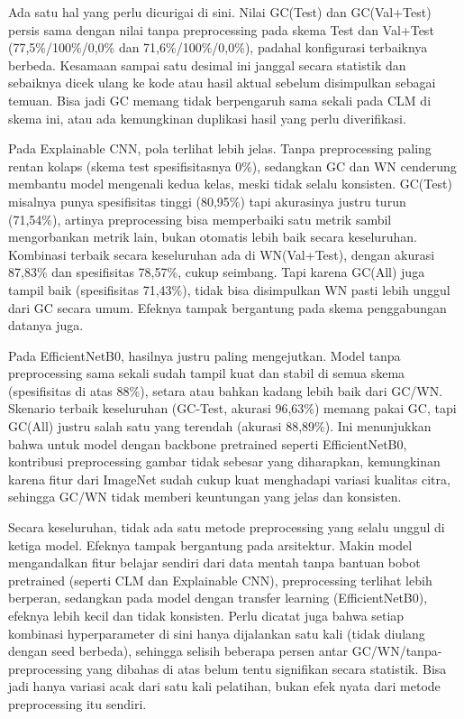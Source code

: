 Ada satu hal yang perlu dicurigai di sini. Nilai GC(Test) dan GC(Val+Test) persis sama dengan nilai tanpa preprocessing pada skema Test dan Val+Test (77,5\%/100\%/0,0\% dan 71,6\%/100\%/0,0\%), padahal konfigurasi terbaiknya berbeda. Kesamaan sampai satu desimal ini janggal secara statistik dan sebaiknya dicek ulang ke kode atau hasil aktual sebelum disimpulkan sebagai temuan. Bisa jadi GC memang tidak berpengaruh sama sekali pada CLM di skema ini, atau ada kemungkinan duplikasi hasil yang perlu diverifikasi.

Pada Explainable CNN, pola terlihat lebih jelas. Tanpa preprocessing paling rentan kolaps (skema test spesifisitasnya 0\%), sedangkan GC dan WN cenderung membantu model mengenali kedua kelas, meski tidak selalu konsisten. GC(Test) misalnya punya spesifisitas tinggi (80,95\%) tapi akurasinya justru turun (71,54\%), artinya preprocessing bisa memperbaiki satu metrik sambil mengorbankan metrik lain, bukan otomatis lebih baik secara keseluruhan. Kombinasi terbaik secara keseluruhan ada di WN(Val+Test), dengan akurasi 87,83\% dan spesifisitas 78,57\%, cukup seimbang. Tapi karena GC(All) juga tampil baik (spesifisitas 71,43\%), tidak bisa disimpulkan WN pasti lebih unggul dari GC secara umum. Efeknya tampak bergantung pada skema penggabungan datanya juga.

Pada EfficientNetB0, hasilnya justru paling mengejutkan. Model tanpa preprocessing sama sekali sudah tampil kuat dan stabil di semua skema (spesifisitas di atas 88\%), setara atau bahkan kadang lebih baik dari GC/WN. Skenario terbaik keseluruhan (GC-Test, akurasi 96,63\%) memang pakai GC, tapi GC(All) justru salah satu yang terendah (akurasi 88,89\%). Ini menunjukkan bahwa untuk model dengan backbone pretrained seperti EfficientNetB0, kontribusi preprocessing gambar tidak sebesar yang diharapkan, kemungkinan karena fitur dari ImageNet sudah cukup kuat menghadapi variasi kualitas citra, sehingga GC/WN tidak memberi keuntungan yang jelas dan konsisten.

Secara keseluruhan, tidak ada satu metode preprocessing yang selalu unggul di ketiga model. Efeknya tampak bergantung pada arsitektur. Makin model mengandalkan fitur belajar sendiri dari data mentah tanpa bantuan bobot pretrained (seperti CLM dan Explainable CNN), preprocessing terlihat lebih berperan, sedangkan pada model dengan transfer learning (EfficientNetB0), efeknya lebih kecil dan tidak konsisten. Perlu dicatat juga bahwa setiap kombinasi hyperparameter di sini hanya dijalankan satu kali (tidak diulang dengan seed berbeda), sehingga selisih beberapa persen antar GC/WN/tanpa-preprocessing yang dibahas di atas belum tentu signifikan secara statistik. Bisa jadi hanya variasi acak dari satu kali pelatihan, bukan efek nyata dari metode preprocessing itu sendiri.

